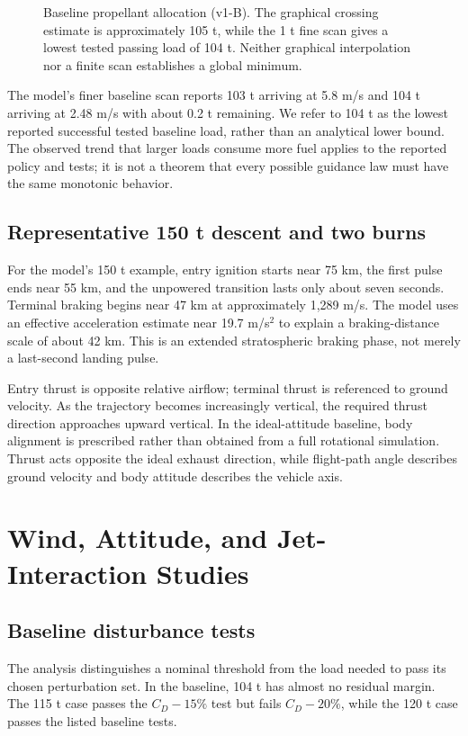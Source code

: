 \documentclass[11pt,a4paper]{article}
\begin{document}
\begin{figure}[htbp]
\centering\SourceFuelPlot
\caption{Baseline propellant allocation (v1-B). The graphical crossing estimate is approximately 105 t, while the 1 t fine scan gives a lowest tested passing load of 104 t. Neither graphical interpolation nor a finite scan establishes a global minimum.}
\label{fig:fuel}
\end{figure}

The model's finer baseline scan reports 103 t arriving at 5.8 m/s and 104 t arriving at 2.48 m/s with about 0.2 t remaining. We refer to 104 t as the lowest reported successful tested baseline load, rather than an analytical lower bound. The observed trend that larger loads consume more fuel applies to the reported policy and tests; it is not a theorem that every possible guidance law must have the same monotonic behavior.

\subsection{Representative 150 t descent and two burns}


For the model's 150 t example, entry ignition starts near 75 km, the first pulse ends near 55 km, and the unpowered transition lasts only about seven seconds. Terminal braking begins near 47 km at approximately 1,289 m/s. The model uses an effective acceleration estimate near 19.7 m/s$^2$ to explain a braking-distance scale of about 42 km. This is an extended stratospheric braking phase, not merely a last-second landing pulse.




Entry thrust is opposite relative airflow; terminal thrust is referenced to ground velocity. As the trajectory becomes increasingly vertical, the required thrust direction approaches upward vertical. In the ideal-attitude baseline, body alignment is prescribed rather than obtained from a full rotational simulation. Thrust acts opposite the ideal exhaust direction, while flight-path angle describes ground velocity and body attitude describes the vehicle axis.

\section{Wind, Attitude, and Jet-Interaction Studies}
\subsection{Baseline disturbance tests}
The analysis distinguishes a nominal threshold from the load needed to pass its chosen perturbation set. In the baseline, 104 t has almost no residual margin. The 115 t case passes the $C_D-15\%$ test but fails $C_D-20\%$, while the 120 t case passes the listed baseline tests.
\end{document}
